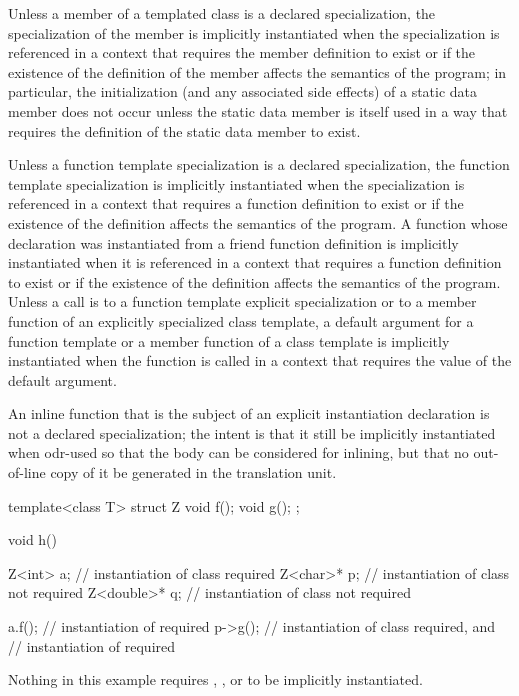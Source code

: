 \pnum
Unless a member of a templated class is a declared specialization,
the specialization of the member is implicitly instantiated when the
specialization is referenced in a context that requires the member definition
to exist or
if the existence of the definition of the member
affects the semantics of the program;
in particular, the initialization (and any associated side effects) of a
static data member does not occur unless the static data member is itself used
in a way that requires the definition of the static data member to exist.

\pnum
Unless a function template specialization is a declared specialization,
the function template specialization is implicitly instantiated when the
specialization is referenced in a context that requires a function definition
to exist or
if the existence of the definition affects the semantics of the program.
A function whose declaration was instantiated from a friend function definition is
implicitly instantiated when it is referenced in a context that
requires a function definition to exist or
if the existence of the definition affects the semantics of the program.
Unless a call is to a function template explicit specialization or
to a member function of an explicitly specialized class template,
a default argument for a function template or a member function of a
class template is implicitly instantiated when the function is
called in a context that requires the value of the default argument.
\begin{note}
An inline function
that is the subject of an explicit instantiation declaration
is not a declared specialization;
the intent is that it still be implicitly instantiated
when odr-used
so that the body can be considered for inlining,
but that no out-of-line copy of it be generated in the translation unit.
\end{note}

\pnum
\begin{example}
\begin{codeblock}
template<class T> struct Z {
  void f();
  void g();
};

void h() {
  Z<int> a;         // instantiation of class  required
  Z<char>* p;       // instantiation of class  not required
  Z<double>* q;     // instantiation of class  not required

  a.f();            // instantiation of  required
  p->g();           // instantiation of class  required, and
                    // instantiation of  required
}
\end{codeblock}

Nothing in this example requires
,
,
or
to be implicitly instantiated.
\end{example}

